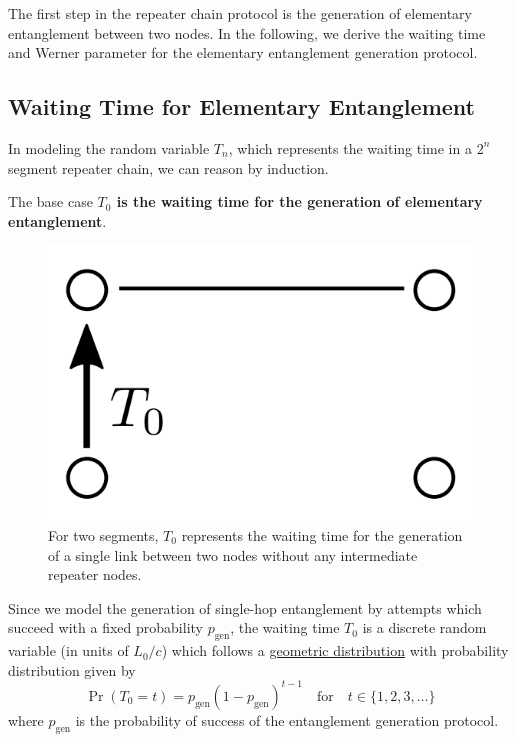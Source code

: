 \documentclass{masterthesis}
\begin{document}
The first step in the repeater chain protocol is the generation of elementary entanglement between two nodes.
In the following, we derive the waiting time and Werner parameter for the elementary entanglement generation protocol.

\subsection*{Waiting Time for Elementary Entanglement}
In modeling the random variable $T_n$, which represents the waiting time in a $2^n$ segment repeater chain, we can reason by induction.

The base case \textbf{$T_0$ is the waiting time for the generation of elementary entanglement}.

\begin{figure}[ht]
    \centering
    \includegraphics[width=0.2\linewidth]{images/gen.png}
    \caption{For two segments, $T_0$ represents the waiting time for the generation of a single link between two nodes without any intermediate repeater nodes.}
    \label{fig:gen} %
\end{figure}

Since we model the generation of single-hop entanglement by attempts which succeed with a fixed probability $p_{\text{gen}}$, the waiting time $T_0$ is a discrete random variable (in units of $L_0 /c$) which follows a \hyperref[section:geometric_distribution]{geometric distribution} with probability distribution given by 
\begin{equation}
    \Pr(T_0 = t) = p_{\text{gen}} (1 - p_{\text{gen}})^{t-1} \quad \text{for} \quad t \in \{1, 2, 3, \ldots \}
\end{equation}
where $p_{\text{gen}}$ is the probability of success of the entanglement generation protocol.

\end{document}
